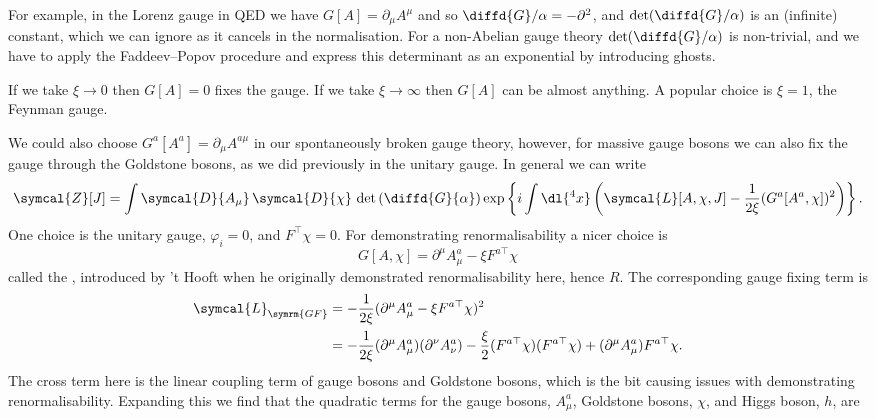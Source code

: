 \documentclass[fleqn]{NotesClass}
\newcommand{\lagrangianDensity}{\symcal{L}}
\newcommand{\DL}[1]{\symcal{D}{#1}}
\newcommand{\DD}[1]{\,\symcal{D}{#1}}
\newcommand{\dalembertian}{\partial^2}
\newcommand{\trans}{\top}
\newcommand{\partitionFunction}{\symcal{Z}}
\begin{document}
    For example, in the Lorenz gauge in QED we have \(G[A] = \partial_\mu A^\mu\) and so \(\diffd{G}/{\alpha} = -\dalembertian\), and \(\det(\diffd{G}/{\alpha})\) is an (infinite) constant, which we can ignore as it cancels in the normalisation.
    For a non-Abelian gauge theory \(\det(\diffd{G}/{\alpha})\) is non-trivial, and we have to apply the Faddeev--Popov procedure and express this determinant as an exponential by introducing ghosts.
    
    If we take \(\xi \to 0\) then \(G[A] = 0\) fixes the gauge.
    If we take \(\xi \to \infty\) then \(G[A]\) can be almost anything.
    A popular choice is \(\xi = 1\), the Feynman gauge.
    
    We could also choose \(G^a[A^a] = \partial_\mu A^{a\mu}\) in our spontaneously broken gauge theory, however, for massive gauge bosons we can also fix the gauge through the Goldstone bosons, as we did previously in the unitary gauge.
    In general we can write
    \begin{equation*}
        \partitionFunction[J] = \int \DL{A_\mu} \DD{\chi}  \, \det\left( \diffd{G}{\alpha} \right) \exp\left\{ i \int \dl{^4x} \left( \lagrangianDensity[A, \chi, J] - \frac{1}{2\xi}(G^a[A^a, \chi])^2 \right) \right\}.
    \end{equation*}
    One choice is the unitary gauge, \(\varphi_i = 0\),  and \(F^\trans \chi = 0\).
    For demonstrating renormalisability a nicer choice is
    \begin{equation}
        G[A, \chi] = \partial^\mu A^a_\mu - \xi F^{a\trans} \chi
    \end{equation}
    called the , introduced by 't Hooft when he originally demonstrated renormalisability here, hence \(R\).
    The corresponding gauge fixing term is
    \begin{align}
        \lagrangianDensity_{\symrm{GF}} &= -\frac{1}{2\xi} (\partial^\mu A^a_\mu - \xi F^{a\trans} \chi)^2\\
        &= -\frac{1}{2\xi} (\partial^\mu A^a_\mu)(\partial^\nu A^a_\nu) - \frac{\xi}{2}(F^{a\trans}\chi)(F^{a\trans}\chi) + (\partial^\mu A^a_\mu) F^{a\trans}\chi.
    \end{align}
    The cross term here is the linear coupling term of gauge bosons and Goldstone bosons, which is the bit causing issues with demonstrating renormalisability.
    Expanding this we find that the quadratic terms for the gauge bosons, \(A^a_\mu\), Goldstone bosons, \(\chi\), and Higgs boson, \(h\), are
\end{document}
